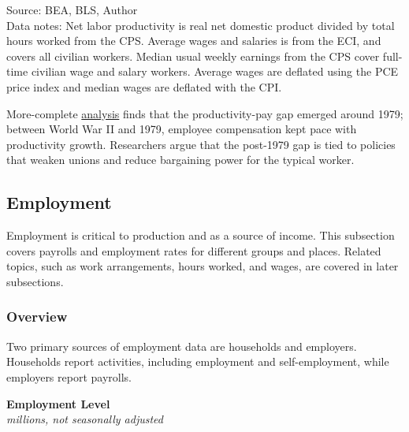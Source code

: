 \documentclass{report}
\newcommand{\tbllink}[1]{\href{https://raw.githubusercontent.com/bdecon/US-chartbook/master/chartbook/data/#1}{\faTable}}
\begin{document}
{\begin{minipage}{0.76\textwidth}
\footnotesize{Source: BEA, BLS, Author} \hfill \tbllink{payprod.csv}\\
\footnotesize{Data notes: Net labor productivity is real net domestic product divided by total hours worked from the CPS. Average wages and salaries is from the ECI, and covers all civilian workers. Median usual weekly earnings from the CPS cover full-time civilian wage and salary workers. Average wages are deflated using the PCE price index and median wages are deflated with the CPI.}
\vspace{1mm}

\small More-complete \href{https://www.epi.org/productivity-pay-gap/}{analysis} finds that the productivity-pay gap emerged around 1979; between World War II and 1979, employee compensation kept pace with productivity growth. Researchers argue that the post-1979 gap is tied to policies that weaken unions and reduce bargaining power for the typical worker. 
\end{minipage}
\newpage
\begin{minipage}{0.76\textwidth} 
\hypertarget{labe}{\label{labe}}
\subsection*{Employment}
\small Employment is critical to production and as a source of income. This subsection covers payrolls and employment rates for different groups and places. Related topics, such as work arrangements, hours worked, and wages, are covered in later subsections. 

\subsubsection*{Overview}
\vspace*{-0.5mm}

\small Two primary sources of employment data are households and employers. Households report activities, including employment and self-employment, while employers report payrolls.


\end{minipage}

\begin{minipage}{0.42\textwidth}
\normalsize \textbf{Employment Level}\\
\footnotesize{\textit{millions, not seasonally adjusted}}
\vspace{4.25cm}


\end{minipage}}
\end{document}
